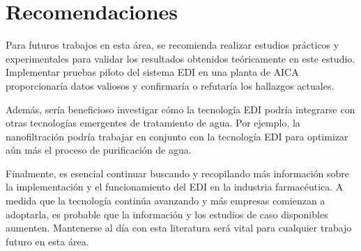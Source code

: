 \chapter*{Recomendaciones}
{}
\vspace{-2cm} 
Para futuros trabajos en esta área, se recomienda realizar estudios prácticos y
experimentales para validar los resultados obtenidos teóricamente en este estudio.
Implementar pruebas piloto del sistema EDI en una planta de AICA proporcionaría
datos valiosos y confirmaría o refutaría los hallazgos actuales.

Además, sería beneficioso investigar cómo la tecnología EDI podría integrarse
con otras tecnologías emergentes de tratamiento de agua. Por ejemplo,
la nanofiltración podría
trabajar en conjunto con la tecnología EDI para optimizar aún más el
proceso de purificación de agua.

Finalmente, es esencial continuar buscando y recopilando más información
sobre la implementación y el funcionamiento del EDI en la industria farmacéutica.
A medida que la tecnología continúa avanzando y más empresas comienzan a adoptarla,
es probable que la información y los estudios de caso disponibles aumenten.
Mantenerse al día con esta literatura será vital para cualquier trabajo futuro en esta área.